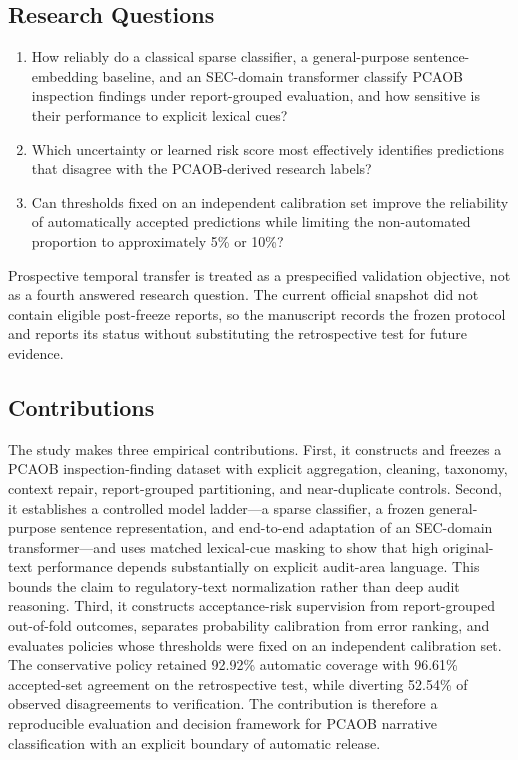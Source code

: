 \documentclass[11pt]{article}
\begin{document}
\subsection{Research Questions}

\begin{enumerate}[label=\textbf{RQ\arabic*:},leftmargin=*]
  \item How reliably do a classical sparse classifier, a general-purpose sentence-embedding baseline, and an SEC-domain transformer classify PCAOB inspection findings under report-grouped evaluation, and how sensitive is their performance to explicit lexical cues?
  \item Which uncertainty or learned risk score most effectively identifies predictions that disagree with the PCAOB-derived research labels?
  \item Can thresholds fixed on an independent calibration set improve the reliability of automatically accepted predictions while limiting the non-automated proportion to approximately 5\% or 10\%?
\end{enumerate}

Prospective temporal transfer is treated as a prespecified validation objective,
not as a fourth answered research question. The current official snapshot did not
contain eligible post-freeze reports, so the manuscript records the frozen
protocol and reports its status without substituting the retrospective test for
future evidence.

\subsection{Contributions}

The study makes three empirical contributions. First, it constructs and freezes a
PCAOB inspection-finding dataset with explicit aggregation, cleaning, taxonomy,
context repair, report-grouped partitioning, and near-duplicate controls. Second,
it establishes a controlled model ladder---a sparse classifier, a frozen
general-purpose sentence representation, and end-to-end adaptation of an
SEC-domain transformer---and uses matched lexical-cue masking to show that high
original-text performance depends substantially on explicit audit-area language.
This bounds the claim to regulatory-text normalization rather than deep audit
reasoning. Third, it constructs acceptance-risk supervision
from report-grouped out-of-fold outcomes, separates probability calibration from
error ranking, and evaluates policies whose thresholds were fixed on an
independent calibration set. The conservative policy retained 92.92\% automatic
coverage with 96.61\% accepted-set agreement on the retrospective test, while
diverting 52.54\% of observed disagreements to verification. The contribution is
therefore a reproducible evaluation and decision framework for PCAOB narrative
classification with an explicit boundary of automatic release.
\end{document}
